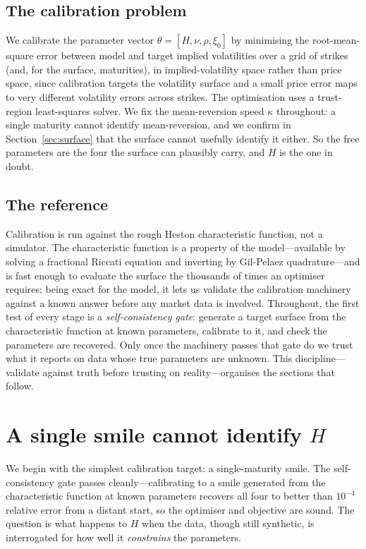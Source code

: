 \documentclass[11pt]{article}
\begin{document}
\subsection{The calibration problem}

We calibrate the parameter vector $\theta=[H,\nu,\rho,\xi_0]$ by minimising the
root-mean-square error between model and target implied volatilities over a grid of strikes
(and, for the surface, maturities), in implied-volatility space rather than price space, since
calibration targets the volatility surface and a small price error maps to very different
volatility errors across strikes. The optimisation uses a trust-region least-squares solver.
We fix the mean-reversion speed $\kappa$ throughout: a single maturity cannot identify
mean-reversion, and we confirm in Section~\ref{sec:surface} that the surface cannot usefully
identify it either. So the free parameters are the four the surface can plausibly carry, and
$H$ is the one in doubt.

\subsection{The reference}

Calibration is run against the rough Heston characteristic function, not a simulator. The
characteristic function is a property of the model---available by solving a fractional Riccati
equation and inverting by Gil-Pelaez quadrature---and is fast enough to evaluate the surface
the thousands of times an optimiser requires; being exact for the model, it lets us validate
the calibration machinery against a known answer before any market data is involved. Throughout,
the first test of every stage is a \emph{self-consistency gate}: generate a target surface from
the characteristic function at known parameters, calibrate to it, and check the parameters are
recovered. Only once the machinery passes that gate do we trust what it reports on data whose
true parameters are unknown. This discipline---validate against truth before trusting on
reality---organises the sections that follow.

\section{A single smile cannot identify \texorpdfstring{$H$}{H}}\label{sec:single}

We begin with the simplest calibration target: a single-maturity smile. The self-consistency
gate passes cleanly---calibrating to a smile generated from the characteristic function at known
parameters recovers all four to better than $10^{-4}$ relative error from a distant start, so the
optimiser and objective are sound. The question is what happens to $H$ when the data, though still
synthetic, is interrogated for how well it \emph{constrains} the parameters.
\end{document}
